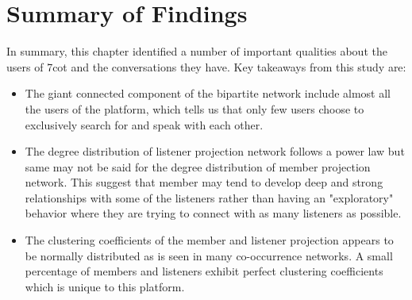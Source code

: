 \section{Summary of Findings}
In summary, this chapter identified a number of important qualities about the users of 
7cot and the conversations they have. Key takeaways from this study are: 
\begin{itemize}
	\item The giant connected component of the bipartite network include almost all the users of the platform, which tells us that only few users choose to exclusively search for and speak with each other.
	\item The degree distribution of listener projection network follows a power law but same may not be said for the degree distribution of member projection network. This suggest that member may tend to develop deep and strong relationships with some of the listeners rather than having an "exploratory" behavior where they are trying to connect with as many listeners as possible. 
	\item The clustering coefficients of the member and listener projection appears to be normally distributed as is seen in many co-occurrence networks. A small percentage of members and listeners exhibit perfect clustering coefficients which is unique to this platform.
\end{itemize}
